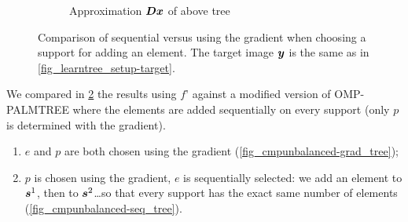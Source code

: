 \begin{figure}[!ht]
\begin{subfigure}[b]{0.49\textwidth}
	\caption{Approximation $\bm{D}\bm{x}$ of above tree}\label{fig_cmpunbalanced-seq_approx}
\end{subfigure}
\caption{Comparison of sequential versus using the gradient when choosing a support for adding an element. The target image $\bm{y}$ is the same as in \cref{fig_learntree_setup-target}.}\label{fig_cmpunbalanced-seq_vs_grad}
\end{figure}

\FloatBarrier
\noindent
We compared in \cref{fig_cmpunbalanced-seq_vs_grad} the results using $f’$ against a modified version of OMP-PALMTREE where the elements are added sequentially on every support (only $p$ is determined with the gradient).
\begin{enumerate}[label=(\alph*),noitemsep,]
	\item $e$ and $p$ are both chosen using the gradient (\cref{fig_cmpunbalanced-grad_tree});
	\item $p$ is chosen using the gradient, $e$ is sequentially selected: we add an element to $\bm{s}^1$, then to $\bm{s}^2$\dots so that every support has the exact same number of elements (\cref{fig_cmpunbalanced-seq_tree}).
\end{enumerate}


